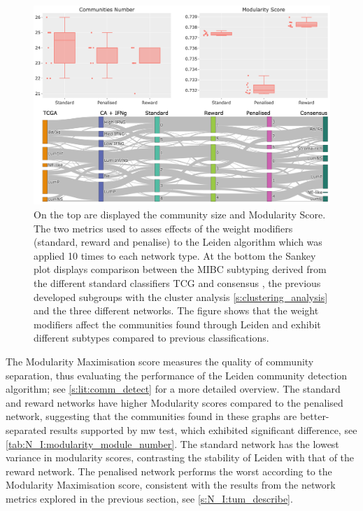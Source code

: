 \begin{figure}[!t]    
    \centering
    \includegraphics[width=1.0\textwidth,keepaspectratio]{Sections/Network_I/Resources/Tum_network/LeidenMetrics_Sankey_TF-6.png}
    \caption[Tum: Leiden metrics]{On the top are displayed the community size and Modularity Score. The two metrics used to asses effects of the weight modifiers (standard, reward and penalise) to the Leiden algorithm which was applied 10 times to each network type. At the bottom the Sankey plot displays comparison between the MIBC subtyping derived from the different standard classifiers TCG and consensus \citep{Robertson2017-mg,Kamoun2020-tj}, the previous developed subgroups with the cluster analysis \cref{s:clustering_analysis} and the three different networks. The figure shows that the weight modifiers affect the communities found through Leiden and exhibit different subtypes compared to previous classifications.}
    \label{fig:N_I:tum_leiden_modifiers}
\end{figure}


The Modularity Maximisation score measures the quality of community separation, thus evaluating the performance of the Leiden community detection algorithm; see \cref{s:lit:comm_detect} for a more detailed overview. The standard and reward networks have higher Modularity scores compared to the penalised network, suggesting that the communities found in these graphs are better-separated results supported by \acrlong{mw} test, which exhibited significant difference, see \cref{tab:N_I:modularity_module_number}. The standard network has the lowest variance in modularity scores, contrasting the stability of Leiden with that of the reward network. The penalised network performs the worst according to the Modularity Maximisation score, consistent with the results from the network metrics explored in the previous section, see \cref{s:N_I:tum_describe}.

